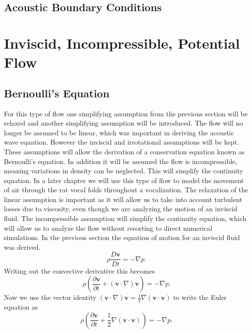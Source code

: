 \documentclass[12pt, letter]{report}
\begin{document}
\subsection{Acoustic Boundary Conditions}

\section{Inviscid, Incompressible, Potential Flow}
\subsection{Bernoulli's Equation}
For this type of flow one simplifying assumption from the previous section will be relaxed and another simplifying assumption will be introduced. The flow will no longer be assumed to be linear, which was important in deriving the acoustic wave equation. However the inviscid and irrotational assumptions will be kept. These assumptions will allow the derivation of a conservation equation known as Bernoulli's equation. In addition it will be assumed the flow is incompressible, meaning variations in density can be neglected. This will simplify the continuity equation. In a later chapter we will use this type of flow to model the movement of air through the rat vocal folds throughout a vocalization. The relaxation of the linear assumption is important as it will allow us to take into account turbulent losses due to viscosity, even though we are analyzing the motion of an inviscid fluid. The incompressible assumption will simplify the continuity equation, which will allow us to analyze the flow without resorting to direct numerical simulations. In the previous section the equation of motion for an inviscid fluid was derived.
\begin{equation}
\rho \frac{D \textbf{v}}{D t} = -\nabla p.
\end{equation}
Writing out the convective derivative this becomes
\begin{equation}
\rho \left( \frac{\partial  \textbf{v}}{\partial t} +  (\textbf{v} \cdot \nabla)  \textbf{v} \right) = -\nabla p.
\end{equation}
Now we use the vector identity $(\textbf{v} \cdot \nabla)  \textbf{v}=\frac{1}{2} \nabla ( \textbf{v} \cdot \textbf{v} )$ to write the Euler equation as
\begin{equation}
\rho \left( \frac{\partial  \textbf{v}}{\partial t} +  \frac{1}{2} \nabla ( \textbf{v} \cdot \textbf{v} ) \right) = -\nabla p.
\end{equation}
\end{document}
